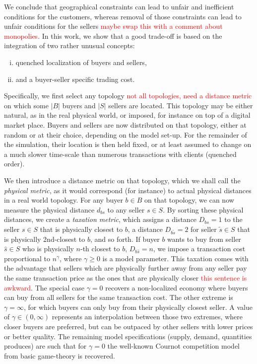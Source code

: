 \documentclass[a4paper,12pt]{article}
\newcommand{\red}[1]{\textcolor{red}{#1}} %
\begin{document}
We conclude that geographical constraints can lead to unfair and inefficient conditions for the customers, whereas removal of those constraints can lead to unfair conditions for the sellers \red{maybe swap this with a comment about monopolies}. 
In this work, we show that a good trade-off is based on the integration of two rather unusual concepts:
\begin{enumerate}[(i),topsep=0pt,itemsep=-1ex,partopsep=1ex,parsep=1ex]
	
	\item quenched localization of buyers and sellers, 
	
	\item and a buyer-seller specific trading cost.

\end{enumerate}

Specifically, we first select any topology \red{not all topologies, need a distance metric} on which some $|B|$ buyers and $|S|$ sellers are located. 
This topology may be either natural, as in the real physical world, or imposed, for instance on top of a digital market place.  
Buyers and sellers are now distributed on that topology, either at random or at their choice, depending on the model set-up. 
For the remainder of the simulation, their location is then held fixed, or at least assumed to change on a much slower time-scale than numerous transactions with clients (quenched order). 

We then introduce a distance metric on that topology, which we shall call the \textit{physical metric}, as it would correspond (for instance) to actual physical distances in a real world topology. 
For any buyer $b \in B$ on that topology, we can now measure the physical distance $d_{bs}$ to any seller $s \in S$. 
By sorting these physical distances, we create a \textit{taxation metric}, which assigns a distance $D_{bs}=1$ to the seller $s \in S$ that is physically closest to $b$, a distance $D_{b\tilde{s}}=2$ for seller $\tilde{s} \in S$ that is physically 2nd-closest to $b$, and so forth. 
If buyer $b$ wants to buy from seller $\hat{s} \in S$ who is physically $n$-th closest to $b$, $D_{b \hat{s}}=n$, 
we impose a transaction cost proportional to $n^\gamma$, where $\gamma \geqslant 0$ is a model parameter. 
This taxation comes with the advantage that sellers which are physically further
away from any seller pay the same transaction price as the ones that are
physically closer \red{this sentence is awkward}. 
The special case $\gamma = 0$ recovers a non-localized economy where buyers can buy from all sellers for the same transaction cost. 
The other extreme is $\gamma=\infty$, for which buyers can only buy from their physically closest seller. 
A value of $\gamma \in (0, \infty)$ represents an interpolation between those two extremes, where closer buyers are preferred, but can be outpaced by other sellers with lower prices or better quality. 
The remaining model specifications (supply, demand, quantities produces) are such that for $\gamma = 0$ the well-known Cournot competition model from basic game-theory is recovered. 
\end{document}
